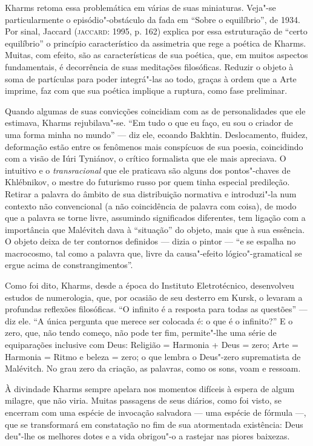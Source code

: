 Kharms retoma essa problemática em várias de suas miniaturas. Veja"-se
particularmente o episódio"-obstáculo da fada em ``Sobre o equilíbrio'',
de 1934. Por sinal, Jaccard (\textsc{jaccard}: 1995, p. 162) explica por
essa estruturação de ``certo equilíbrio'' o princípio característico da
assimetria que rege a poética de Kharms. Muitas, com efeito, são as
características de sua poética, que, em muitos aspectos fundamentais, é
decorrência de suas meditações filosóficas. Reduzir o objeto à soma de
partículas para poder integrá"-las ao todo, graças à ordem que a Arte
imprime, faz com que sua poética implique a ruptura, como fase
preliminar.

Quando algumas de suas convicções coincidiam com as de personalidades
que ele estimava, Kharms rejubilava"-se. ``Em tudo o que eu faço, eu sou
o criador de uma forma minha no mundo'' --- diz ele, ecoando Bakhtin.
Deslocamento, fluidez, deformação estão entre os fenômenos mais
conspícuos de sua poesia, coincidindo com a visão de Iúri Tyniánov, o
crítico formalista que ele mais apreciava. O intuitivo e o
\emph{transracional} que ele praticava são alguns dos pontos"-chaves de
Khlébnikov, o mestre do futurismo russo por quem tinha especial
predileção. Retirar a palavra do âmbito de sua distribuição normativa e
introduzi"-la num contexto não convencional (a não coincidência de
palavra com coisa), de modo que a palavra se torne livre, assumindo
significados diferentes, tem ligação com a importância que Malévitch
dava à ``situação'' do objeto, mais que à sua essência. O objeto deixa
de ter contornos definidos --- dizia o pintor --- ``e se espalha no
macrocosmo, tal como a palavra que, livre da causa"-efeito
lógico"-gramatical se ergue acima de constrangimentos''.

Como foi dito, Kharms, desde a época do Instituto Eletrotécnico,
desenvolveu estudos de numerologia, que, por ocasião de seu desterro em
Kursk, o levaram a profundas reflexões filosóficas. ``O infinito é a
resposta para todas as questões'' --- diz ele. ``A única pergunta que
merece ser colocada é: o que é o infinito?'' E o zero, que, não tendo
começo, não pode ter fim, permite"-lhe uma série de equiparações
inclusive com Deus: Religião = Harmonia + Deus = zero; Arte = Harmonia =
Ritmo e beleza = zero; o que lembra o Deus"-zero suprematista de
Malévitch. No grau zero da criação, as palavras, como os sons, voam e
ressoam.

À divindade Kharms sempre apelara nos momentos difíceis à espera de
algum milagre, que não viria. Muitas passagens de seus diários, como foi
visto, se encerram com uma espécie de invocação salvadora --- uma espécie
de fórmula ---, que se transformará em constatação no fim de sua
atormentada existência: Deus deu"-lhe os melhores dotes e a vida
obrigou"-o a rastejar nas piores baixezas.


